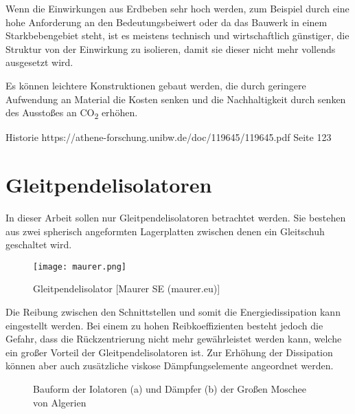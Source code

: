 Wenn die Einwirkungen aus Erdbeben sehr hoch werden, zum Beispiel durch eine hohe Anforderung an den Bedeutungsbeiwert oder da das Bauwerk in einem Starkbebengebiet steht, ist es meistens technisch und wirtschaftlich günstiger, die Struktur von der Einwirkung zu isolieren, damit sie dieser nicht mehr vollends ausgesetzt wird.

Es können leichtere Konstruktionen gebaut werden, die durch geringere Aufwendung an Material die Kosten senken und die Nachhaltigkeit durch senken des Ausstoßes an CO\textsubscript{2} erhöhen.











Historie https://athene-forschung.unibw.de/doc/119645/119645.pdf Seite 123












\section{Gleitpendelisolatoren}
\label{sec:gleitisolatoren}

In dieser Arbeit sollen nur Gleitpendelisolatoren betrachtet werden. Sie bestehen aus zwei spherisch angeformten Lagerplatten zwischen denen ein Gleitschuh geschaltet wird.

\begin{figure}[H]
    \centering
    \texttt{[image: maurer.png]}
    \caption{Gleitpendelisolator [Maurer SE (maurer.eu)]}
\end{figure}

Die Reibung zwischen den Schnittstellen und somit die Energiedissipation kann eingestellt werden.
Bei einem zu hohen Reibkoeffizienten besteht jedoch die Gefahr, dass die Rückzentrierung nicht mehr gewährleistet werden kann, welche ein großer Vorteil der Gleitpendelisolatoren ist.
Zur Erhöhung der Dissipation können aber auch zusätzliche viskose Dämpfungselemente angeordnet werden.

\begin{figure}%
    \centering
    \qquad
    \caption{Bauform der Iolatoren (a) und Dämpfer (b) der Großen Moschee von Algerien \cite{AKK}}%
\end{figure}

